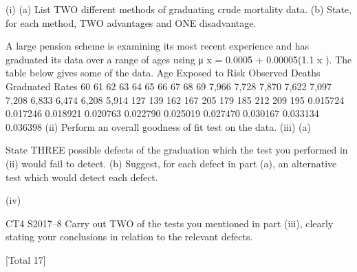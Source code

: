 \documentclass[a4paper,12pt]{article}
\begin{document}
(i)
(a) List TWO different methods of graduating crude mortality data.
(b) State, for each method, TWO advantages and ONE disadvantage.

A large pension scheme is examining its most recent experience and has graduated its
data over a range of ages using μ x = 0.0005 + 0.00005(1.1 x ). The table below gives
some of the data.
Age Exposed to Risk Observed Deaths Graduated Rates
60
61
62
63
64
65
66
67
68
69 7,966
7,728
7,870
7,622
7,097
7,208
6,833
6,474
6,208
5,914 127
139
162
167
205
179
185
212
209
195 0.015724
0.017246
0.018921
0.020763
0.022790
0.025019
0.027470
0.030167
0.033134
0.036398
(ii) Perform an overall goodness of fit test on the data.
(iii) (a)

State THREE possible defects of the graduation which the test you
performed in (ii) would fail to detect.
(b)
Suggest, for each defect in part (a), an alternative test which would
detect each defect.

(iv)

CT4 S2017–8
Carry out TWO of the tests you mentioned in part (iii), clearly stating your
conclusions in relation to the relevant defects.

[Total 17]

\end{document}

